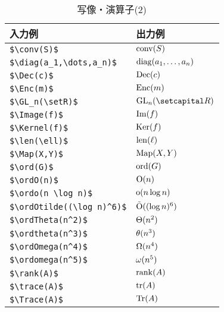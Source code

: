 \documentclass[uplatex]{jsreport}
\begin{document}
\begin{table}[htbp]
  \centering
  \caption{写像・演算子(2)}
  \label{table:2.operaor1.2}
  \begin{tabular}{ll}\hline
    入力例 & 出力例 \\ \hline 
    \verb|$\conv(S)$| & $\operatorname{conv}(S)$ \\
    \verb|$\diag(a_1,\dots,a_n)$| & $\operatorname{diag}(a_1,\dots,a_n)$ \\
    \verb|$\Dec(c)$| & $\operatorname{Dec}(c)$ \\
    \verb|$\Enc(m)$| & $\operatorname{Enc}(m)$ \\
    \verb|$\GL_n(\setR)$| & $\GL_n(\setR)$ \\
    \verb|$\Image(f)$| & $\operatorname{Im}(f)$ \\
    \verb|$\Kernel(f)$| & $\operatorname{Ker}(f)$ \\
    \verb|$\len(\ell)$| & $\operatorname{len}(\ell)$ \\
    \verb|$\Map(X,Y)$| & $\operatorname{Map}(X,Y)$ \\
    \verb|$\ord(G)$| & $\operatorname{ord}(G)$ \\
    \verb|$\ordO(n)$| & $\operatorname{O}(n)$ \\
    \verb|$\ordo(n \log n)$| & $\operatorname{o}(n \log n)$ \\
    \verb|$\ordOtilde((\log n)^6)$| & $\operatorname{\tilde{O}}((\log n)^6)$ \\
    \verb|$\ordTheta(n^2)$| & $\operatorname{\Theta}(n^2)$ \\
    \verb|$\ordtheta(n^3)$| & $\operatorname{\theta}(n^3)$ \\
    \verb|$\ordOmega(n^4)$| & $\operatorname{\Omega}(n^4)$ \\
    \verb|$\ordomega(n^5)$| & $\operatorname{\omega}(n^5)$ \\
    \verb|$\rank(A)$| & $\operatorname{rank}(A)$ \\
    \verb|$\trace(A)$| & $\operatorname{tr}(A)$ \\
    \verb|$\Trace(A)$| & $\operatorname{Tr}(A)$ \\\hline
  \end{tabular}\par
\end{table}\par
\newpage
\end{document}

